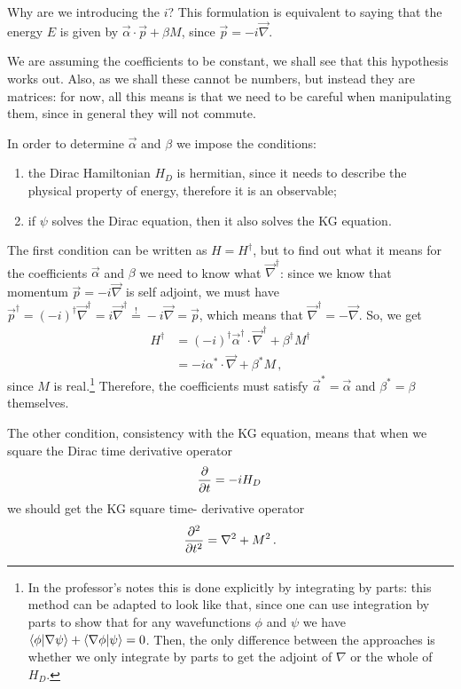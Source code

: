 \documentclass[main.tex]{subfiles}
\begin{document}
Why are we introducing the \(i\)? This formulation is equivalent to saying that the energy \(E\) is given by \(\vec{\alpha} \cdot \vec{p} + \beta M\), since \(\vec{p} = - i \vec{\nabla}\). 

We are assuming the coefficients to be constant, we shall see that this hypothesis works out. Also, as we shall these cannot be numbers, but instead they are matrices: for now, all this means is that we need to be careful when manipulating them, since in general they will not commute. 

In order to determine \(\vec{\alpha }\) and \(\beta \) we impose the conditions: 
\begin{enumerate}
  \item the Dirac Hamiltonian \(H_D\) is hermitian, since it needs to describe the physical property of energy, therefore it is an observable;
  \item if \(\psi \) solves the Dirac equation, then it also solves the KG equation. 
\end{enumerate}


The first condition can be written as \(H = H ^\dag\), but to find out what it means for the coefficients \(\vec{\alpha }\) and \(\beta \) we need to know what \(\vec{\nabla} ^\dag\): since we know that momentum \(\vec{p} = -i \vec{\nabla}\) is self adjoint, we must have \(\vec{p} ^\dag = (-i) ^\dag \vec{\nabla} ^\dag = i \vec{\nabla} ^\dag \overset{!}{=} -i \vec{\nabla} = \vec{p} \),
which means that \(\vec{\nabla} ^\dag = - \vec{\nabla}\).
So, we get 
%
\begin{align}
H ^\dag &= (-i) ^\dag \vec{\alpha} ^\dag \cdot \vec{\nabla} ^\dag + \beta ^\dag M ^\dag  \\
&= -i \alpha^{*} \cdot \vec{\nabla} + \beta^{*} M
\,,
\end{align}
%
since \(M\) is real.\footnote{In the professor's notes this is done explicitly by integrating by parts: this method can be adapted to look like that, since one can use integration by parts to show that for any wavefunctions \(\phi \) and \(\psi \) we have \(\braket{\phi }{\nabla \psi } + \braket{\nabla \phi}{\psi } = 0\). Then, the only difference between the approaches is whether we only integrate by parts to get the adjoint of \(\nabla\) or the whole of \(H_D\). }
Therefore, the coefficients must satisfy \(\vec{a}^{*} = \vec{\alpha}\) and \(\beta^{*} = \beta \) themselves. 

The other condition, consistency with the KG equation, means that when we square the Dirac time derivative operator 
%
\begin{align}
\pdv{}{t} = -i H_D
\,
\end{align}
%
we should get the KG square time- derivative operator 
%
\begin{align}
\pdv[2]{}{t} = \nabla^2 + M^2
\,.
\end{align}
\end{document}
